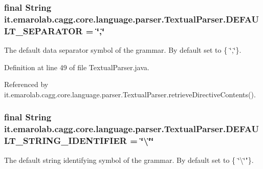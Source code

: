 \hypertarget{classit_1_1emarolab_1_1cagg_1_1core_1_1language_1_1parser_1_1TextualParser_afd804f787ce5a65aec1bddbe5f258f74}{
\subsubsection[{D\-E\-F\-A\-U\-L\-T\-\_\-\-S\-E\-P\-A\-R\-A\-T\-O\-R}]{\setlength{\rightskip}{0pt plus 5cm}final String it.\-emarolab.\-cagg.\-core.\-language.\-parser.\-Textual\-Parser.\-D\-E\-F\-A\-U\-L\-T\-\_\-\-S\-E\-P\-A\-R\-A\-T\-O\-R = \char`\"{},\char`\"{}\hspace{0.3cm}{\ttfamily [static]}}}\label{classit_1_1emarolab_1_1cagg_1_1core_1_1language_1_1parser_1_1TextualParser_afd804f787ce5a65aec1bddbe5f258f74}
The default data separator symbol of the grammar. By default set to \{ \char`\"{},\char`\"{}\}. 

Definition at line 49 of file Textual\-Parser.\-java.



Referenced by it.\-emarolab.\-cagg.\-core.\-language.\-parser.\-Textual\-Parser.\-retrieve\-Directive\-Contents().

\hypertarget{classit_1_1emarolab_1_1cagg_1_1core_1_1language_1_1parser_1_1TextualParser_aec543b552ded4668a73c7b2bf5b9301d}{
\subsubsection[{D\-E\-F\-A\-U\-L\-T\-\_\-\-S\-T\-R\-I\-N\-G\-\_\-\-I\-D\-E\-N\-T\-I\-F\-I\-E\-R}]{\setlength{\rightskip}{0pt plus 5cm}final String it.\-emarolab.\-cagg.\-core.\-language.\-parser.\-Textual\-Parser.\-D\-E\-F\-A\-U\-L\-T\-\_\-\-S\-T\-R\-I\-N\-G\-\_\-\-I\-D\-E\-N\-T\-I\-F\-I\-E\-R = \char`\"{}\textbackslash{}\char`\"{}\char`\"{}\hspace{0.3cm}{\ttfamily [static]}}}\label{classit_1_1emarolab_1_1cagg_1_1core_1_1language_1_1parser_1_1TextualParser_aec543b552ded4668a73c7b2bf5b9301d}
The default string identifying symbol of the grammar. By default set to \{ \char`\"{}\textbackslash{}\char`\"{}"\}. 

